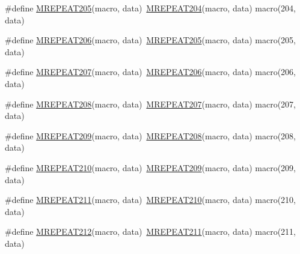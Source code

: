 \begin{DoxyCompactItemize}
\item 
\#define \mbox{\hyperlink{group__group__sam0__utils__mrepeat_gae672303fe7f3ba300d061715db22723f}{M\+R\+E\+P\+E\+A\+T205}}(macro,  data)~\mbox{\hyperlink{group__group__sam0__utils__mrepeat_ga0e339097dee89fd4eaf9885f32db1c16}{M\+R\+E\+P\+E\+A\+T204}}(macro, data)   macro(204, data)
\item 
\#define \mbox{\hyperlink{group__group__sam0__utils__mrepeat_ga899fa83ef3f1e32c26c7decdb29e5747}{M\+R\+E\+P\+E\+A\+T206}}(macro,  data)~\mbox{\hyperlink{group__group__sam0__utils__mrepeat_gae672303fe7f3ba300d061715db22723f}{M\+R\+E\+P\+E\+A\+T205}}(macro, data)   macro(205, data)
\item 
\#define \mbox{\hyperlink{group__group__sam0__utils__mrepeat_ga3f4ed7437c340ec027580d80fdbfc353}{M\+R\+E\+P\+E\+A\+T207}}(macro,  data)~\mbox{\hyperlink{group__group__sam0__utils__mrepeat_ga899fa83ef3f1e32c26c7decdb29e5747}{M\+R\+E\+P\+E\+A\+T206}}(macro, data)   macro(206, data)
\item 
\#define \mbox{\hyperlink{group__group__sam0__utils__mrepeat_ga376e9d40a620958fa73305665ad13e5d}{M\+R\+E\+P\+E\+A\+T208}}(macro,  data)~\mbox{\hyperlink{group__group__sam0__utils__mrepeat_ga3f4ed7437c340ec027580d80fdbfc353}{M\+R\+E\+P\+E\+A\+T207}}(macro, data)   macro(207, data)
\item 
\#define \mbox{\hyperlink{group__group__sam0__utils__mrepeat_ga6febba153ad3a3ea0ddd84b95ddded40}{M\+R\+E\+P\+E\+A\+T209}}(macro,  data)~\mbox{\hyperlink{group__group__sam0__utils__mrepeat_ga376e9d40a620958fa73305665ad13e5d}{M\+R\+E\+P\+E\+A\+T208}}(macro, data)   macro(208, data)
\item 
\#define \mbox{\hyperlink{group__group__sam0__utils__mrepeat_ga888280894db1adc77f3524c72d226bc3}{M\+R\+E\+P\+E\+A\+T210}}(macro,  data)~\mbox{\hyperlink{group__group__sam0__utils__mrepeat_ga6febba153ad3a3ea0ddd84b95ddded40}{M\+R\+E\+P\+E\+A\+T209}}(macro, data)   macro(209, data)
\item 
\#define \mbox{\hyperlink{group__group__sam0__utils__mrepeat_ga9b4e3f709d79be3abf426a6f35373a9f}{M\+R\+E\+P\+E\+A\+T211}}(macro,  data)~\mbox{\hyperlink{group__group__sam0__utils__mrepeat_ga888280894db1adc77f3524c72d226bc3}{M\+R\+E\+P\+E\+A\+T210}}(macro, data)   macro(210, data)
\item 
\#define \mbox{\hyperlink{group__group__sam0__utils__mrepeat_gad82f46aaf9a5b824c91394754824d66d}{M\+R\+E\+P\+E\+A\+T212}}(macro,  data)~\mbox{\hyperlink{group__group__sam0__utils__mrepeat_ga9b4e3f709d79be3abf426a6f35373a9f}{M\+R\+E\+P\+E\+A\+T211}}(macro, data)   macro(211, data)

\end{DoxyCompactItemize}
